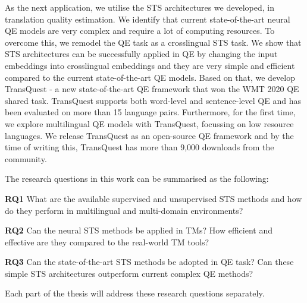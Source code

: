 As the next application, we utilise the STS architectures we developed, in translation quality estimation. We identify that current state-of-the-art neural QE models are very complex and require a lot of computing resources. To overcome this, we remodel the QE task as a crosslingual STS task.  We show that STS architectures can be successfully applied in QE by changing the input embeddings into crosslingual embeddings and they are very simple and efficient compared to the current state-of-the-art QE models. Based on that, we develop TransQuest - a new state-of-the-art QE framework that won the WMT 2020 QE shared task. TransQuest supports both word-level and sentence-level QE and has been evaluated on more than 15 language pairs. Furthermore, for the first time, we explore multilingual QE models with TransQuest, focussing on low resource languages. We release TransQuest as an open-source QE framework and by the time of writing this, TransQuest has more than 9,000 downloads from the community. 

The research questions in this work can be summarised as the following:

\textbf{RQ1} What are the available supervised and unsupervised STS methods and how do they perform in multilingual and multi-domain environments? 

\textbf{RQ2} Can the neural STS methods be applied in TMs? How efficient and effective are they compared to the real-world TM tools?

\textbf{RQ3} Can the state-of-the-art STS methods be adopted in QE task? Can these simple STS architectures outperform current complex QE methods? 

Each part of the thesis will address these research questions separately.

